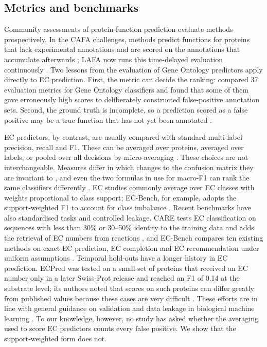 \subsection{Metrics and benchmarks}\label{sec:related:metrics}

Community assessments of protein function prediction evaluate methods prospectively. In the CAFA challenges, methods predict functions for proteins that lack experimental annotations and are scored on the annotations that accumulate afterwards \citep{Radivojac2013,Jiang2016,Zhou2019}; LAFA now runs this time-delayed evaluation continuously \citep{Phan2026}. Two lessons from the evaluation of Gene Ontology predictors apply directly to EC prediction. First, the metric can decide the ranking: \citet{Plyusnin2019} compared 37 evaluation metrics for Gene Ontology classifiers and found that some of them gave erroneously high scores to deliberately constructed false-positive annotation sets. Second, the ground truth is incomplete, so a prediction scored as a false positive may be a true function that has not yet been annotated \citep{Jiang2014}.

EC predictors, by contrast, are usually compared with standard multi-label precision, recall and F1. These can be averaged over proteins, averaged over labels, or pooled over all decisions by micro-averaging \citep{Zhang2014}. These choices are not interchangeable. Measures differ in which changes to the confusion matrix they are invariant to \citep{Sokolova2009}, and even the two formulas in use for macro-F1 can rank the same classifiers differently \citep{Opitz2019}. EC studies commonly average over EC classes with weights proportional to class support; EC-Bench, for example, adopts the support-weighted F1 to account for class imbalance \citep{Davoudi2026}. Recent benchmarks have also standardised tasks and controlled leakage. CARE tests EC classification on sequences with less than 30\% or 30--50\% identity to the training data and adds the retrieval of EC numbers from reactions \citep{YangJ2024}, and EC-Bench compares ten existing methods on exact EC prediction, EC completion and EC recommendation under uniform assumptions \citep{Davoudi2026}. Temporal hold-outs have a longer history in EC prediction. ECPred was tested on a small set of proteins that received an EC number only in a later Swiss-Prot release and reached an F1 of 0.14 at the substrate level; its authors noted that scores on such proteins can differ greatly from published values because these cases are very difficult \citep{Dalkiran2018}. These efforts are in line with general guidance on validation and data leakage in biological machine learning \citep{Walsh2021,Kapoor2023}. To our knowledge, however, no study has asked whether the averaging used to score EC predictors counts every false positive. We show that the support-weighted form does not.

